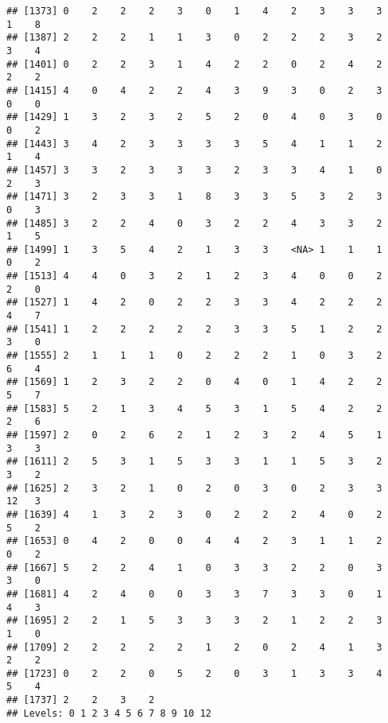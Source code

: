 \documentclass[
]{article}
\newenvironment{Shaded}{\begin{snugshade}}{\end{snugshade}}
\newcommand{\AttributeTok}[1]{\textcolor[rgb]{0.77,0.63,0.00}{#1}}
\newcommand{\CommentTok}[1]{\textcolor[rgb]{0.56,0.35,0.01}{\textit{#1}}}
\newcommand{\FunctionTok}[1]{\textcolor[rgb]{0.00,0.00,0.00}{#1}}
\newcommand{\NormalTok}[1]{#1}
\newcommand{\OtherTok}[1]{\textcolor[rgb]{0.56,0.35,0.01}{#1}}
\newcommand{\SpecialCharTok}[1]{\textcolor[rgb]{0.00,0.00,0.00}{#1}}
\newcommand{\StringTok}[1]{\textcolor[rgb]{0.31,0.60,0.02}{#1}}
\begin{document}
\begin{verbatim}
## [1373] 0    2    2    2    3    0    1    4    2    3    3    3    1    8   
## [1387] 2    2    2    1    1    3    0    2    2    2    3    2    3    4   
## [1401] 0    2    2    3    1    4    2    2    0    2    4    2    2    2   
## [1415] 4    0    4    2    2    4    3    9    3    0    2    3    0    0   
## [1429] 1    3    2    3    2    5    2    0    4    0    3    0    0    2   
## [1443] 3    4    2    3    3    3    3    5    4    1    1    2    1    4   
## [1457] 3    3    2    3    3    3    2    3    3    4    1    0    2    3   
## [1471] 3    2    3    3    1    8    3    3    5    3    2    3    0    3   
## [1485] 3    2    2    4    0    3    2    2    4    3    3    2    1    5   
## [1499] 1    3    5    4    2    1    3    3    <NA> 1    1    1    0    2   
## [1513] 4    4    0    3    2    1    2    3    4    0    0    2    2    0   
## [1527] 1    4    2    0    2    2    3    3    4    2    2    2    4    7   
## [1541] 1    2    2    2    2    2    3    3    5    1    2    2    3    0   
## [1555] 2    1    1    1    0    2    2    2    1    0    3    2    6    4   
## [1569] 1    2    3    2    2    0    4    0    1    4    2    2    5    7   
## [1583] 5    2    1    3    4    5    3    1    5    4    2    2    2    6   
## [1597] 2    0    2    6    2    1    2    3    2    4    5    1    3    3   
## [1611] 2    5    3    1    5    3    3    1    1    5    3    2    3    2   
## [1625] 2    3    2    1    0    2    0    3    0    2    3    3    12   3   
## [1639] 4    1    3    2    3    0    2    2    2    4    0    2    5    2   
## [1653] 0    4    2    0    0    4    4    2    3    1    1    2    0    2   
## [1667] 5    2    2    4    1    0    3    3    2    2    0    3    3    0   
## [1681] 4    2    4    0    0    3    3    7    3    3    0    1    4    3   
## [1695] 2    2    1    5    3    3    3    2    1    2    2    3    1    0   
## [1709] 2    2    2    2    2    1    2    0    2    4    1    3    2    2   
## [1723] 0    2    2    0    5    2    0    3    1    3    3    4    5    4   
## [1737] 2    2    3    2   
## Levels: 0 1 2 3 4 5 6 7 8 9 10 12
\end{verbatim}

\begin{Shaded}
\end{Shaded}
\end{document}
